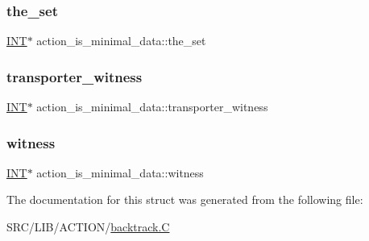 \subsubsection{\texorpdfstring{the\+\_\+set}{the\_set}}
{\footnotesize\ttfamily \mbox{\hyperlink{galois_8h_a09fddde158a3a20bd2dcadb609de11dc}{I\+NT}}$\ast$ action\+\_\+is\+\_\+minimal\+\_\+data\+::the\+\_\+set}

\mbox{\label{structaction__is__minimal__data_a35b3469f2e67af9ff473a4eb45a430bd}} 
\subsubsection{\texorpdfstring{transporter\+\_\+witness}{transporter\_witness}}
{\footnotesize\ttfamily \mbox{\hyperlink{galois_8h_a09fddde158a3a20bd2dcadb609de11dc}{I\+NT}}$\ast$ action\+\_\+is\+\_\+minimal\+\_\+data\+::transporter\+\_\+witness}

\mbox{\label{structaction__is__minimal__data_a79a870387085b72696c205e962b745db}} 
\subsubsection{\texorpdfstring{witness}{witness}}
{\footnotesize\ttfamily \mbox{\hyperlink{galois_8h_a09fddde158a3a20bd2dcadb609de11dc}{I\+NT}}$\ast$ action\+\_\+is\+\_\+minimal\+\_\+data\+::witness}



The documentation for this struct was generated from the following file\+:\begin{DoxyCompactItemize}
\item 
S\+R\+C/\+L\+I\+B/\+A\+C\+T\+I\+O\+N/\mbox{\hyperlink{backtrack_8_c}{backtrack.\+C}}\end{DoxyCompactItemize}
